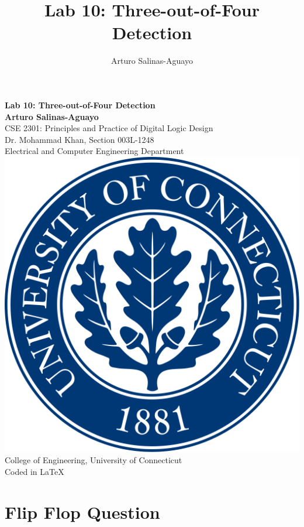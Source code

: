 \documentclass[12pt]{article}
\author{Arturo Salinas-Aguayo}
\title{Lab 10: Three-out-of-Four Detection}
\begin{document}
\newcommand{\closure}[2][3]{%
	{}\mkern#1mu\overline{\mkern-#1mu#2}}
\newcommand\ncoverline[1]{\mkern1mu\overline{\mkern-1mu#1\mkern-1mu}\mkern1mu}
\begin{titlepage}
	\centering
	\vspace*{3cm}
	\huge\textbf{Lab 10: Three-out-of-Four Detection}\\
	\vspace{5cm}
	\Large\textbf{Arturo Salinas-Aguayo}\\
	\normalsize
	CSE 2301: Principles and Practice of Digital Logic Design\\
	Dr. Mohammad Khan, Section 003L-1248\\
	Electrical and Computer Engineering Department
	\vfill
	\includegraphics[scale=0.1]{uconnlogo}\\
	College of Engineering, University of Connecticut\\
	\scriptsize{Coded in \LaTeX}
	\vspace*{1cm}
\end{titlepage}
\section*{Flip Flop Question}
\end{document}
